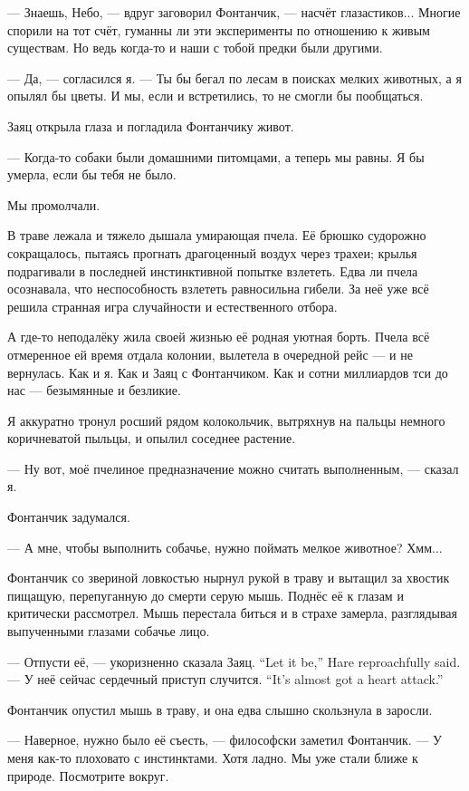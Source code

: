 --- Знаешь, Небо, --- вдруг заговорил Фонтанчик, --- насчёт глазастиков...
Многие спорили на тот счёт, гуманны ли эти эксперименты по отношению к живым существам.
Но ведь когда-то и наши с тобой предки были другими.

--- Да, --- согласился я.
--- Ты бы бегал по лесам в поисках мелких животных, а я опылял бы цветы.
И мы, если и встретились, то не смогли бы пообщаться.

Заяц открыла глаза и погладила Фонтанчику живот.

--- Когда-то собаки были домашними питомцами, а теперь мы равны.
Я бы умерла, если бы тебя не было.

Мы промолчали.

В траве лежала и тяжело дышала умирающая пчела.
Её брюшко судорожно сокращалось, пытаясь прогнать драгоценный воздух через трахеи; крылья подрагивали в последней инстинктивной попытке взлететь.
Едва ли пчела осознавала, что неспособность взлететь равносильна гибели.
За неё уже всё решила странная игра случайности и естественного отбора.

А где-то неподалёку жила своей жизнью её родная уютная борть.
Пчела всё отмеренное ей время отдала колонии, вылетела в очередной рейс --- и не вернулась.
Как и я.
Как и Заяц с Фонтанчиком.
Как и сотни миллиардов тси до нас --- безымянные и безликие.

Я аккуратно тронул росший рядом колокольчик, вытряхнув на пальцы немного коричневатой пыльцы, и опылил соседнее растение.

--- Ну вот, моё пчелиное предназначение можно считать выполненным, --- сказал я.

Фонтанчик задумался.

--- А мне, чтобы выполнить собачье, нужно поймать мелкое животное?
Хмм...

Фонтанчик со звериной ловкостью нырнул рукой в траву и вытащил за хвостик пищащую, перепуганную до смерти серую мышь.
Поднёс её к глазам и критически рассмотрел.
Мышь перестала биться и в страхе замерла, разглядывая выпученными глазами собачье лицо.

{--- Отпусти её, --- укоризненно сказала Заяц.}
{``Let it be,'' Hare reproachfully said.}
{--- У неё сейчас сердечный приступ случится.}
{``It's almost got a heart attack.''}

Фонтанчик опустил мышь в траву, и она едва слышно скользнула в заросли.

--- Наверное, нужно было её съесть, --- философски заметил Фонтанчик.
--- У меня как-то плоховато с инстинктами.
Хотя ладно.
Мы уже стали ближе к природе.
Посмотрите вокруг.

